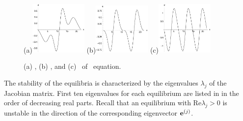 \begin{figure}[t]
\begin{center} 
(a)\includegraphics[width=0.25\textwidth]{figs/1wKS22equil.eps}
(b)\includegraphics[width=0.25\textwidth]{figs/2wKS22equil.eps}
(c)\includegraphics[width=0.25\textwidth]{figs/3wKS22equil.eps}
\end{center}
\caption{
(a) , (b) , and (c)
 \eqva\ of \KS\ equation.
}
\label{f:KS22Equil}
\end{figure}

The stability of the equilibria is characterized by the eigenvalues
$\lambda_j$ of the Jacobian matrix.  First ten eigenvalues for each
equilibrium are listed in  in the order of
decreasing real parts. Recall that an equilibrium with $\mathrm{Re}
\lambda_j > 0$ is unstable in the direction of the corresponding
eigenvector ${\mathbf e}^{(j)}$.

